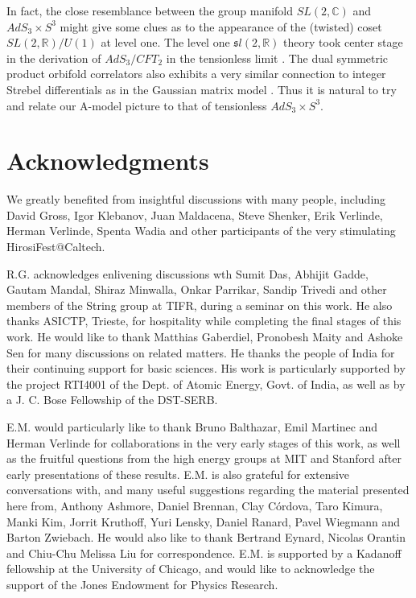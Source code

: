 \documentclass[english]{article}
\begin{document}
\begin{itemize}
    In fact, the close resemblance between the group manifold $SL(2,\mathbb{C})$ and $AdS_3 \times S^3$ might give some clues as to the appearance of the (twisted) coset $SL(2,\mathbb{R})/U(1)$ at level one. The level one ${\mathfrak sl}(2, {\mathbb R})$ theory took center stage in the derivation of  $AdS_3/CFT_2$ in the tensionless limit \cite{eberhardt2019worldsheet, eberhardt2020deriving}. 
    The dual symmetric product orbifold correlators also exhibits a very similar connection to integer Strebel differentials as in the Gaussian matrix model \cite{gaberdiel2021symmetric}. Thus it is natural to try and relate our A-model picture to that of tensionless $AdS_3 \times S^3$.
      
\end{itemize}

\section*{Acknowledgments}
We greatly benefited from insightful discussions with many people, including David Gross, Igor Klebanov, Juan Maldacena, Steve Shenker, Erik Verlinde, Herman Verlinde, Spenta Wadia and other participants of the very stimulating HirosiFest@Caltech.

R.G. acknowledges enlivening discussions wth Sumit Das, Abhijit Gadde, Gautam Mandal, Shiraz Minwalla, Onkar Parrikar, Sandip Trivedi and other members of the String group at TIFR, during a seminar on this work. He also thanks ASICTP, Trieste, for hospitality while completing the final stages of this work. He would like to thank Matthias Gaberdiel, Pronobesh Maity and Ashoke Sen for many discussions on related matters.  He thanks the people of India for their continuing support for basic sciences. His work is particularly supported by the project RTI4001 of the Dept. of Atomic Energy, Govt. of India, as well as by a J. C. Bose Fellowship of the DST-SERB. 

E.M. would particularly like to thank Bruno Balthazar, Emil Martinec and Herman Verlinde for collaborations in the very early stages of this work, as well as the fruitful questions from the high energy groups at MIT and Stanford after early presentations of these results. E.M. is also grateful for extensive conversations with, and many useful suggestions regarding the material presented here from, Anthony Ashmore, Daniel Brennan, Clay C\'ordova, Taro Kimura, Manki Kim, Jorrit Kruthoff, Yuri Lensky, Daniel Ranard, Pavel Wiegmann and Barton Zwiebach. He would also like to thank Bertrand Eynard, Nicolas Orantin and Chiu-Chu Melissa Liu for correspondence. E.M. is supported by a Kadanoff fellowship at the University of Chicago, and would like to acknowledge the support of the Jones Endowment for Physics Research.  
\end{document}
